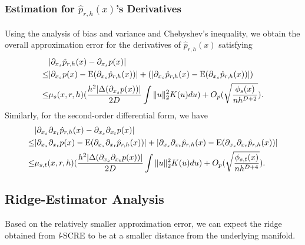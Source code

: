 \documentclass[aos,preprint]{imsart}
\theoremstyle{remark}
\begin{document}
\subsubsection{Estimation for $\hat{p}_{r,h}(x)$'s Derivatives}
Using the analysis of bias and variance and Chebyshev's inequality, we obtain the overall approximation error for the derivatives of $\hat{p}_{r,h}(x)$ satisfying
\begin{equation}\label{bias_result_final}
\begin{aligned}
 &|\partial_{x_s} \hat{p}_{r,h}(x)-\partial_{x_s} p(x)|\\
 \leq & |\partial_{x_s} p(x) - {\rm E} (\partial_{x_s}\hat{p}_{r,h}(x)) |+(|\partial_{x_s} \hat{p}_{r,h}(x) - {\rm E} (\partial_{x_s}\hat{p}_{r,h}(x)) | )\\
\leq & \mu_s(x, r, h)( \frac{ h^2|\Delta(\partial_{x_s} p(x))|}{2D}  \int \|u\|_2^2 K(u) du) + O_p(\sqrt{\frac{\phi_s(x)}{n h^{D+2}}}).
\end{aligned}
\end{equation}
Similarly, for the second-order differential form, we have
\begin{equation}\label{bias_result_final2}
\begin{aligned}
 &|\partial_{x_{s}}\partial_{x_t} \hat{p}_{r,h}(x)-\partial_{x_{s}}\partial_{x_t} p(x)|\\
 \leq & |\partial_{x_{s}}\partial_{x_t} p(x) - {\rm E} (\partial_{x_{s}}\partial_{x_t} \hat{p}_{r,h}(x)) |+|\partial_{x_{s}}\partial_{x_t} \hat{p}_{r,h}(x) - {\rm E} (\partial_{x_s} \partial_{x_t} \hat{p}_{r,h}(x)) | \\
 \leq & \mu_{s,t}(x, r, h)( \frac{ h^2|\Delta(\partial_{x_s} \partial_{x_t} p(x))|}{2D}  \int \|u\|_2^2 K(u) du) + O_p(\sqrt{\frac{\phi_{s,t}(x)}{n h^{D+4}}} ).
\end{aligned}
\end{equation}

\subsection{Ridge-Estimator Analysis}
Based on the relatively smaller approximation error, we can expect the ridge obtained from {\it l}-SCRE to be at a smaller distance from the underlying manifold.
\end{document}
